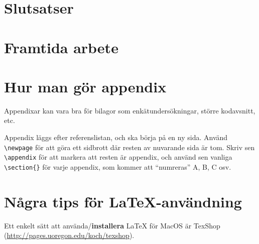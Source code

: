 \documentclass[swedish, a4paper,12pt]{article}
\begin{document}
\section{Slutsatser}

\section{Framtida arbete}

\newpage

%



\newpage
\appendix %
\iffalse \section{Hur man gör appendix}
Appendixar kan vara bra för bilagor som enkätundersökningar, större kodavsnitt, etc.

Appendix läggs efter referenslistan, och ska börja på en ny sida. Använd \verb|\newpage| för att göra ett sidbrott där resten av nuvarande sida är tom. Skriv sen \verb|\appendix| för att markera att resten är appendix, och
 använd sen vanliga \verb|\section{}| för varje appendix, som kommer att ``numreras'' A, B, C osv.

\section{Några tips för La\TeX-användning}

Ett enkelt sätt att använda/\textbf{installera} LaTeX för MacOS är TexShop (\url{http://pages.uoregon.edu/koch/texshop}).
\end{document}
